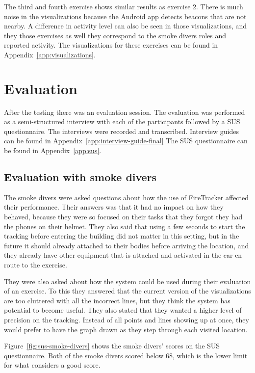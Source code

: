 \documentclass[../Main/thesis.tex]{subfiles}
\begin{document}
The third and fourth exercise shows similar results as exercise 2.
There is much noise in the visualizations because the Android app detects beacons that are not nearby.
A difference in activity level can also be seen in those visualizations, and they those exercises as well they correspond to the smoke divers roles and reported activity.
The visualizations for these exercises can be found in Appendix~\ref{app:visualizations}.

\section{Evaluation}
After the testing there was an evaluation session.
The evaluation was performed as a semi-structured interview with each of the participants followed by a SUS questionnaire.
The interviews were recorded and transcribed.
Interview guides can be found in Appendix~\ref{app:interview-guide-final}
The SUS questionnaire can be found in Appendix~\ref{app:sus}.

\subsection{Evaluation with smoke divers}
The smoke divers were asked questions about how the use of FireTracker affected their performance.
Their answers was that it had no impact on how they behaved, because they were so focused on their tasks that they forgot they had the phones on their helmet.
They also said that using a few seconds to start the tracking before entering the building did not matter in this setting, but in the future it should already attached to their bodies before arriving the location, and they already have other equipment that is attached and activated in the car en route to the exercise.

They were also asked about how the system could be used during their evaluation of an exercise.
To this they answered that the current version of the visualizations are too cluttered with all the incorrect lines, but they think the system has potential to become useful.
They also stated that they wanted a higher level of precision on the tracking.
Instead of all points and lines showing up at once, they would prefer to have the graph drawn as they step through each visited location.

Figure~\ref{fig:sus-smoke-divers} shows the smoke divers' scores on the SUS questionnaire.
Both of the smoke divers scored below 68, which is the lower limit for what \citet{Brooke2013} considers a good score.
\end{document}
